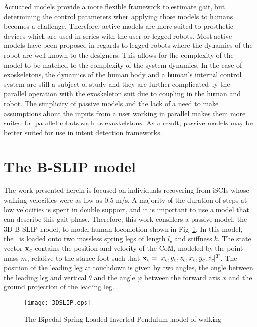 Actuated models provide a more flexible framework to estimate gait, but determining the control parameters when applying those models to humans becomes a challenge. Therefore, active models are more suited to prosthetic devices which are used in series with the user or legged robots. Most active models have been proposed in regards to legged robots where the dynamics of the robot are well known to the designers. This allows for the complexity of the model to be matched to the complexity of the system dynamics. In the case of exoskeletons, the dynamics of the human body and a human's internal control system \cite{wolpert1998internal, dounskaia2005internal, kording2007decision} are still a subject of study and they are further complicated by the parallel operation with the exoskeleton suit due to coupling in the human and robot. The simplicity of passive models and the lack of a need to make assumptions about the inputs from a user working in parallel makes them more suited for parallel robots such as exoskeletons. As a result, passive models may be better suited for use in intent detection frameworks. 

\section{The B-SLIP model}\label{sec:bslip_model}
The work presented herein is focused on individuals recovering from iSCIs whose walking velocities were as low as 0.5 m/s. A majority of the duration of steps at low velocities is spent in double support, and it is important to use a model that can describe this gait phase. Therefore, this work considers a passive model, the 3D B-SLIP model, to model human locomotion shown in Fig~\ref{fig:slip}. In this model, the \COM~is loaded onto two massless spring legs of length $ l_o $ and stiffness $ k $. The state vector $ \mathbf{x}_{c} $ contains the position and velocity of the CoM, modeled by the point mass $ m $, relative to the stance foot such that $ \mathbf{x}_{c} = [x_{c} ,y_{c} ,z_{c} ,\dot{x}_{c} ,\dot{y}_{c} ,\dot{z}_{c}]^T $. The position of the leading leg at touchdown is given by two angles, the angle between the leading leg and vertical $ \theta $ and the angle $ \varphi $ between the forward axis $ x $  and the ground projection of the leading leg.
%
\begin{figure}
	\centering
	\texttt{[image: 3DSLIP.eps]}
	\caption[The Bipedal Spring Loaded Inverted Pendulum]{The Bipedal Spring Loaded Inverted Pendulum \cite{liu2015dynamic} model of walking}\label{fig:slip}
\end{figure}
%

